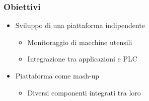 \documentclass{beamer}
\begin{document}
\begin{frame}
\frametitle{Obiettivi}
\begin{itemize}
	\item Sviluppo di una piattaforma indipendente
	\begin{itemize}
		\item Monitoraggio di macchine utensili
		\item Integrazione tra applicazioni e PLC
	\end{itemize}
	\item Piattaforma come mash-up
	\begin{itemize}
		\item Diversi componenti integrati tra loro
	\end{itemize}
\end{itemize}
\end{frame}
\end{document}
